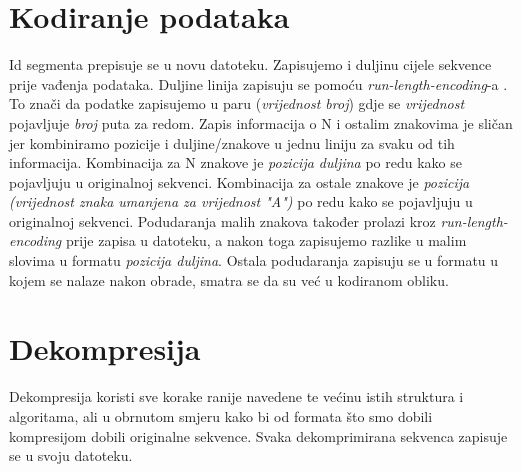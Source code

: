 \section{Kodiranje podataka}
Id segmenta prepisuje se u novu datoteku. Zapisujemo i duljinu cijele sekvence prije vađenja podataka. Duljine linija zapisuju se pomoću \textit{run-length-encoding}-a \cite{hrcm}. To znači da podatke zapisujemo u paru (\textit{vrijednost  broj}) gdje se \textit{vrijednost} pojavljuje \textit{broj} puta za redom. Zapis informacija o N i ostalim znakovima je sličan jer kombiniramo pozicije i duljine/znakove u jednu liniju za svaku od tih informacija. Kombinacija za N znakove je \textit{pozicija duljina} po redu kako se pojavljuju u originalnoj sekvenci. Kombinacija za ostale znakove je \textit{pozicija (vrijednost znaka umanjena za vrijednost "A")} po redu kako se pojavljuju u originalnoj sekvenci. Podudaranja malih znakova također prolazi kroz \textit{run-length-encoding} \cite{hrcm} prije zapisa u datoteku, a nakon toga zapisujemo razlike u malim slovima u formatu \textit{pozicija duljina}. Ostala podudaranja zapisuju se u formatu u kojem se nalaze nakon obrade, smatra se da su već u kodiranom obliku.

\section{Dekompresija}
Dekompresija koristi sve korake ranije navedene te većinu istih struktura i algoritama, ali u obrnutom smjeru kako bi od formata što smo dobili kompresijom dobili originalne sekvence. Svaka dekomprimirana sekvenca zapisuje se u svoju datoteku.